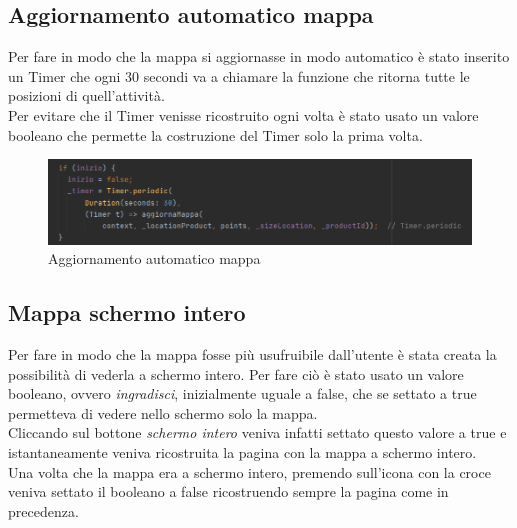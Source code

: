 \newpage

\subsection{Aggiornamento automatico mappa}
Per fare in modo che la mappa si aggiornasse in modo automatico è stato inserito un Timer che ogni 30 secondi va a chiamare la funzione che ritorna tutte le posizioni di quell'attività.\\
Per evitare che il Timer venisse ricostruito ogni volta è stato usato un valore booleano che permette la costruzione del Timer solo la prima volta.\\

\begin{figure}[htbp]	
	\centering
	\includegraphics[width=14cm]{immagini/automatico.png}
	\caption{Aggiornamento automatico mappa}
	\label{fig:Aggiornamento automatico mappa}
\end{figure}

\newpage

\subsection{Mappa schermo intero}
Per fare in modo che la mappa fosse più usufruibile dall'utente è stata creata la possibilità di vederla a schermo intero.
Per fare ciò è stato usato un valore booleano, ovvero \textit{ingradisci}, inizialmente uguale a false, che se settato a true permetteva di vedere nello schermo solo la mappa.\\
Cliccando sul bottone \textit{schermo intero} veniva infatti  settato questo valore a true e istantaneamente veniva ricostruita la pagina con la mappa a schermo intero.\\
Una volta che la mappa era a schermo intero, premendo sull'icona con la croce veniva settato il booleano a false ricostruendo sempre la pagina come in precedenza.\\

